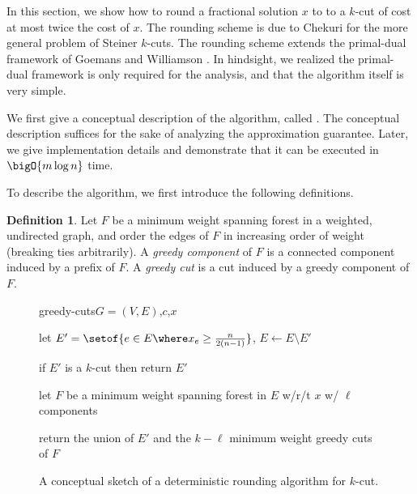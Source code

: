 \documentclass[11pt]{article}
\numberwithin{equation}{section}
\theoremstyle{definition}
\newtheorem{definition}[theorem]{Definition}
\theoremstyle{plain}
\newcommand{\cost}{c} %
\begin{document}

In this section, we show how to round a fractional solution $x$ to
 to a $k$-cut of cost at most twice the cost of
$x$. The rounding scheme is due to Chekuri \etal \cite{cgn-06} for the
more general problem of Steiner $k$-cuts. The rounding scheme extends
the primal-dual framework of Goemans and Williamson
\cite{gw-95,gw-96}. In hindsight, we realized the primal-dual
framework is only required for the analysis, and that the algorithm
itself is very simple.


We first give a conceptual description of the algorithm, called
. The conceptual description suffices for the sake
of analyzing the approximation guarantee. Later, we give
implementation details and demonstrate that it can be executed in
$\bigO{m \log n}$ time.

To describe the algorithm, we first introduce the following
definitions.

\begin{definition}
  Let $F$ be a minimum weight spanning forest in a weighted,
  undirected graph, and order the edges of $F$ in increasing order of
  weight (breaking ties arbitrarily). A \emph{greedy component} of $F$
  is a connected component induced by a prefix of $F$. A \emph{greedy
    cut} is a cut induced by a greedy component of $F$.
\end{definition}


\begin{figure}
  \begin{algorithm}{greedy-cuts}{$G = (V,E)$,$\cost$,$x$} %
  \item let $E' = \setof{e \in E \where x_e \geq \frac{n}{2(n-1)}}$,
    $E \gets E \setminus E'$
  \item if $E'$ is a $k$-cut then return $E'$
  \item let $F$ be a minimum weight spanning forest in $E$ w/r/t $x$
    w/ $\ell$ components
  \item return the union of $E'$ and the $k - \ell$ minimum weight
    greedy cuts of $F$
  \end{algorithm}
  \begin{implicitframed}
    \caption{A conceptual sketch of a deterministic rounding algorithm
      for $k$-cut. }
  \end{implicitframed}
\end{figure}


%
\end{document}
